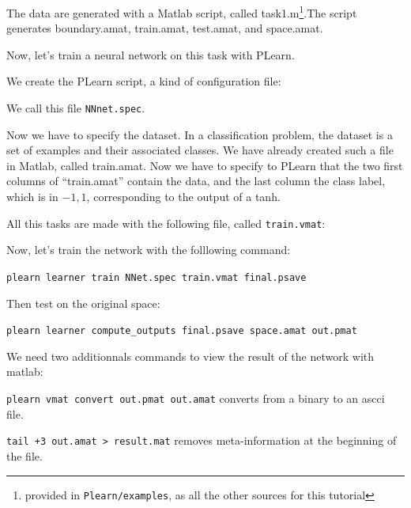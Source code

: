 The data are generated with a Matlab script, called 
task1.m\footnote{provided in \texttt{Plearn/examples}, as all the other sources for this tutorial}.The 
script generates boundary.amat, train.amat, test.amat, and space.amat.
% 

Now, let's train a neural network on this task with PLearn.

We create the PLearn script, a kind of configuration file:


We call this file \texttt{NNnet.spec}.

Now we have to specify the dataset. In a classification problem, the dataset is 
a set of examples and their associated classes. We have already created such a 
file in Matlab, called train.amat.
Now we have to specify to PLearn that the two first columns of ``train.amat'' 
contain the data, and the last column the class label, which is in ${-1,1}$, 
corresponding to the output of a tanh.

All this tasks are made with the following file, called \texttt{train.vmat}:


Now, let's train the network with the folllowing command:

\texttt{plearn learner train NNet.spec train.vmat final.psave}

Then test on the original space:

\texttt{plearn learner compute\_outputs final.psave space.amat 
out.pmat}

We need two additionnals commands to view the result of the network with matlab:

\texttt{plearn vmat convert out.pmat out.amat} converts from a binary to an ascci file.

\texttt{tail +3 out.amat > result.mat} removes meta-information at the beginning of the file.

